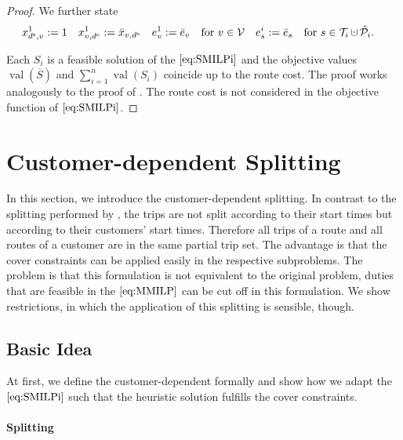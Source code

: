 \begin{proof}
We further state
\begin{align*}
	x^1_{\ds,v} := 1 && x^1_{v,\de} := \bar{x}_{v,\de} && e^1_v := \bar{e}_v && \text{for } v\in\mathcal{V} && e^i_s & := \bar{e}_s && \text{for } s\in\Ti\cupdot\Phat_i.
\end{align*}

Each $S_i$ is a feasible solution of the $\eqref{eq:SMILPi}$ and the objective values $\operatorname{val}(\overline{S})$ and ${\sum_{i=1}^n\operatorname{val}\left(S_i\right)}$ coincide up to the route cost. The proof works analogously to the proof of . The route cost is not considered in the objective function of $\eqref{eq:SMILPi}$.
%
\end{proof}


\section{Customer-dependent Splitting}
\label{sec:customer_dependent_splitting}

In this section, we introduce the customer-dependent splitting. In contrast to the splitting performed by \cite{Knoll}, the trips are not split according to their start times but according to their customers' start times. Therefore all trips of a route and all routes of a customer are in the same partial trip set. The advantage is that the cover constraints can be applied easily in the respective subproblems. The problem is that this formulation is not equivalent to the original problem, \ie duties that are feasible in the $\eqref{eq:MMILP}$ can be cut off in this formulation. We show restrictions, in which the application of this splitting is sensible, though. 

\subsection{Basic Idea}

At first, we define the customer-dependent formally and show how we adapt the $\eqref{eq:SMILPi}$ such that the heuristic solution fulfills the cover constraints.

\paragraph{Splitting} \parfill

